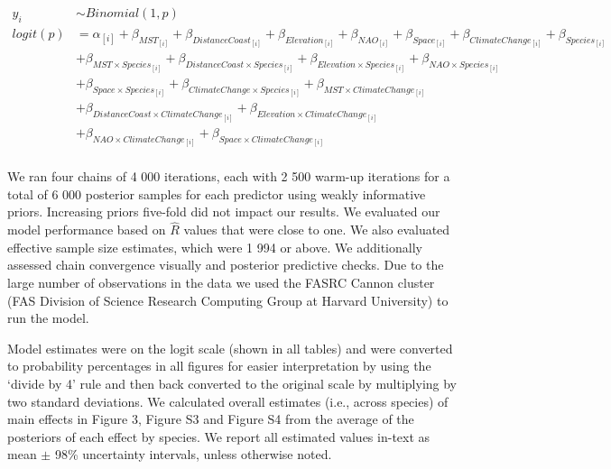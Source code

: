 \documentclass{article}\usepackage[]{graphicx}\usepackage[]{color}
\begin{document}
\begin{align*}
 y_i & \sim Binomial(1,p) \tag{2} \\
logit(p) &= \alpha_{[i]} + \beta_{MST_{[i]}} + \beta_{DistanceCoast_{[i]}} + \beta_{Elevation_{[i]}} + \beta_{NAO_{[i]}} + \beta_{Space_{[i]}} + \beta_{ClimateChange_{[i]}} + \beta_{Species_{[i]}} \\ 
  &+ \beta_{MST \times Species_{[i]}} + \beta_{DistanceCoast \times Species_{[i]}} + \beta_{Elevation \times Species_{[i]}} + \beta_{NAO \times Species_{[i]}}\\
  &+ \beta_{Space \times Species_{[i]}} + \beta_{ClimateChange \times Species_{[i]}} + \beta_{MST \times ClimateChange_{[i]}}\\ 
  &+ \beta_{DistanceCoast \times ClimateChange_{[i]}} + \beta_{Elevation \times ClimateChange_{[i]}}\\ 
  &+ \beta_{NAO \times ClimateChange_{[i]}} + \beta_{Space \times ClimateChange_{[i]}} \nonumber\\
\end{align*}

We ran four chains of 4 000 iterations, each with 2 500 warm-up iterations for a total of 6 000 posterior samples for each predictor using weakly informative priors. Increasing priors five-fold did not impact our results. We evaluated our model performance based on $\hat{R}$ values that were close to one. We also evaluated effective sample size estimates, which were 1 994 or above. We additionally assessed chain convergence visually and posterior predictive checks. Due to the large number of observations in the data we used the FASRC Cannon cluster (FAS Division of Science Research Computing Group at Harvard University) to run the model. 

Model estimates were on the logit scale (shown in all tables) and were converted to probability percentages in all figures for easier interpretation by using the `divide by 4' rule \citep{Gelman2006} and then back converted to the original scale by multiplying by two standard deviations. We calculated overall estimates (i.e., across species) of main effects in Figure 3, Figure S3 and Figure S4 from the average of the posteriors of each effect by species. We report all estimated values in-text as mean $\pm$ 98\% uncertainty intervals, unless otherwise noted. %
\end{document}
